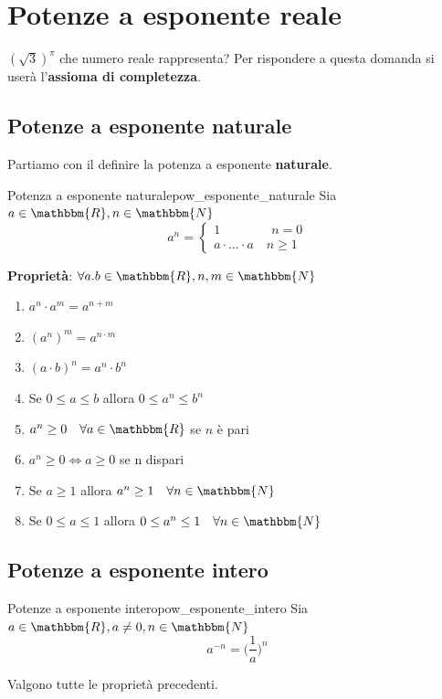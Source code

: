\documentclass[12pt]{report}
\newcounter{definition}
\newcommand{\nmu}{}
\begin{document}
	\chapter{Potenze a esponente reale}
	$(\sqrt{3})^\pi$ che numero reale rappresenta? Per rispondere a questa domanda si userà l'\textbf{assioma di completezza}. \\
	\section{Potenze a esponente naturale}
	Partiamo con il definire la potenza a esponente \textbf{naturale}. \\
	\begin{definition}{\nmu Potenza a esponente naturale}{pow_esponente_naturale}
		Sia $a \in \mathbbm{R}, n \in \mathbbm{N}$ \\
		\[
		a^n = \begin{cases}
			1 \quad \quad \quad \quad  n = 0 \\
			a \cdot \dots \cdot a \quad n \geq 1
		\end{cases}
		\]
	\end{definition}
	\textbf{Proprietà}: $\forall a.b \in \mathbbm{R}, n, m \in \mathbbm{N}$
	\begin{enumerate}
		\item $a^n \cdot a^m = a^{n + m}$ \\
		\item $(a^n)^m = a^{n \cdot m}$ \\
		\item $(a \cdot b)^n = a^n \cdot b^n$
		\item Se $0 \leq a \leq b$ allora $0 \leq a^n \leq b^n$
		\item $a^n \geq 0 \quad \forall a \in \mathbbm{R}$ se $n$ è pari
		\item $a^n \geq 0 \iff a \geq 0$ se n dispari
		\item Se $a \geq 1$ allora $a^n \geq 1 \quad \forall n \in \mathbbm{N}$
		\item Se $0 \leq a \leq 1$ allora $0 \leq a^n \leq 1 \quad \forall n \in \mathbbm{N}$
	\end{enumerate}
	\section{Potenze a esponente intero}
	\begin{definition}{\nmu Potenze a esponente intero}{pow_esponente_intero}
		Sia $a \in \mathbbm{R}, a \neq 0, n \in \mathbbm{N}$ \\
		\[
		a^{-n} = \Big(\dfrac{1}{a}\Big)^n
		\]
	\end{definition}
	Valgono tutte le proprietà precedenti.
\end{document}
